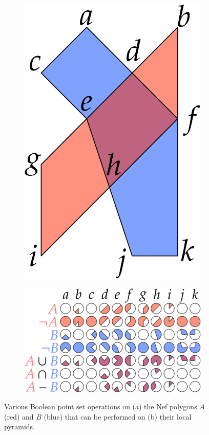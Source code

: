 \begin{figure}
\centering
\begin{subfigure}[b]{0.23\linewidth}
\includegraphics[width=\linewidth]{figs/nef-boolean-1}
\caption{}%
\end{subfigure}
\quad
\begin{subfigure}[b]{0.6\linewidth}
\includegraphics[width=\linewidth]{figs/nef-boolean-2}
\caption{}%
\end{subfigure}
\caption{Various Boolean point set operations on (a) the Nef polygons \(A\) (red) and \(B\) (blue) that can be performed on (b) their local pyramids.}%
\label{fig:nef-boolean}
\end{figure}

